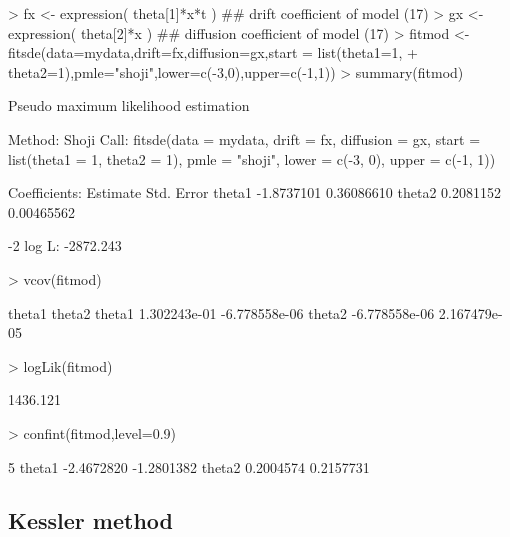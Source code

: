 \begin{Schunk}
\begin{Sinput}
> fx <- expression( theta[1]*x*t ) ## drift coefficient of model (17)
> gx <- expression( theta[2]*x )   ## diffusion coefficient of model (17)
> fitmod <- fitsde(data=mydata,drift=fx,diffusion=gx,start = list(theta1=1,
+                  theta2=1),pmle="shoji",lower=c(-3,0),upper=c(-1,1))
> summary(fitmod)
\end{Sinput}
\begin{Soutput}
Pseudo maximum likelihood estimation

Method:  Shoji
Call:
fitsde(data = mydata, drift = fx, diffusion = gx, start = list(theta1 = 1,
    theta2 = 1), pmle = "shoji", lower = c(-3, 0), upper = c(-1,
    1))

Coefficients:
         Estimate Std. Error
theta1 -1.8737101 0.36086610
theta2  0.2081152 0.00465562

-2 log L: -2872.243
\end{Soutput}
\begin{Sinput}
> vcov(fitmod)
\end{Sinput}
\begin{Soutput}
              theta1        theta2
theta1  1.302243e-01 -6.778558e-06
theta2 -6.778558e-06  2.167479e-05
\end{Soutput}
\begin{Sinput}
> logLik(fitmod)
\end{Sinput}
\begin{Soutput}
[1] 1436.121
\end{Soutput}
\begin{Sinput}
> confint(fitmod,level=0.9)
\end{Sinput}
\begin{Soutput}
              5 %
theta1 -2.4672820 -1.2801382
theta2  0.2004574  0.2157731
\end{Soutput}
\end{Schunk}

\subsection{Kessler method}

